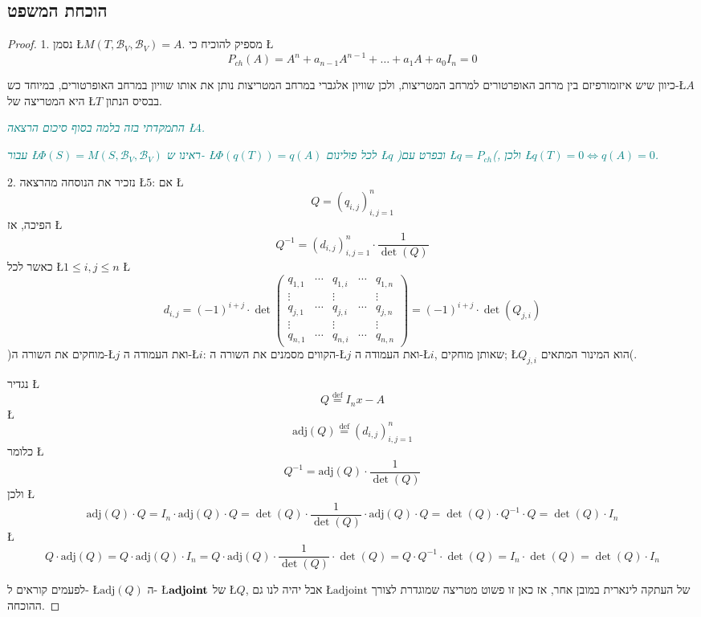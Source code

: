 \documentclass[english,hebrew]{article}
\begin{document}
\subsection{הוכחת המשפט}
\begin{proof}
1. נסמן \L{$M(T,\mathcal{B}_{V},\mathcal{B}_{V})=A$}. מספיק להוכיח
כי \L{%
\[
P_{ch}(A)=A^{n}+a_{n-1}A^{n-1}+\dots+a_{1}A+a_{0}I_{n}=0
\]
}%

כיוון שיש איזומורפיזם בין מרחב האופרטורים למרחב המטריצות, ולכן שוויון
אלגברי במרחב המטריצות נותן את אותו שוויון במרחב האופרטורים, במיוחד
כש-\L{$A$} היא המטריצה של \L{$T$} בבסיס הנתון.

\textcolor{teal}{\emph{התמקדתי בזה בלמה בסוף סיכום הרצאה \L{$4$}.}}

\textcolor{teal}{\emph{עבור \L{$\Phi(S)=M(S,\mathcal{B}_{V},\mathcal{B}_{V})$}
ראינו ש- \L{$\Phi(q(T))=q(A)$} לכל פולינום \L{$q$} )ובפרט עם \L{$q=P_{ch}$}(,
ולכן \L{$q(T)=0\iff q(A)=0$}.}}

2. נזכיר את הנוסחה מהרצאה \L{$5$}: אם \L{%
\[
Q=\left(q_{i,j}\right)_{i,j=1}^{n}
\]
}%
הפיכה, אז \L{%
\[
Q^{-1}=\left(d_{i,j}\right)_{i,j=1}^{n}\cdot\frac{1}{\det(Q)}
\]
}%
כאשר לכל \L{$1\leq i,j\leq n$} \L{%
\[
d_{i,j}=(-1)^{i+j}\cdot\det\left(\begin{array}{cc|c|cc}
q_{1,1} & \cdots & q_{1,i} & \cdots & q_{1,n}\\
\vdots &  & \vdots &  & \vdots\\
\hline q_{j,1} & \cdots & q_{j,i} & \cdots & q_{j,n}\\
\hline \vdots &  & \vdots &  & \vdots\\
q_{n,1} & \cdots & q_{n,i} & \cdots & q_{n,n}
\end{array}\right)=(-1)^{i+j}\cdot\det\left(Q_{j,i}\right)
\]
}%
)מוחקים את השורה ה-\L{$j$} ואת העמודה ה-\L{$i$}: הקווים מסמנים את
השורה ה-\L{$j$} ואת העמודה ה-\L{$i$}, שאותן מוחקים; \L{$Q_{j,i}$}
הוא המינור המתאים(.

נגדיר \L{%
\[
Q\overset{\text{def}}{=}I_{n}x-A
\]
}%
\L{%
\[
\text{adj}(Q)\overset{\text{def}}{=}\left(d_{i,j}\right)_{i,j=1}^{n}
\]
}%
כלומר \L{%
\[
Q^{-1}=\text{adj}(Q)\cdot\frac{1}{\det(Q)}
\]
}%
ולכן \L{%
\[
\text{adj}(Q)\cdot Q=I_{n}\cdot\text{adj}(Q)\cdot Q=\det(Q)\cdot\frac{1}{\det(Q)}\cdot\text{adj}(Q)\cdot Q=\det(Q)\cdot Q^{-1}\cdot Q=\det(Q)\cdot I_{n}
\]
}%
\L{%
\[
Q\cdot\text{adj}(Q)=Q\cdot\text{adj}(Q)\cdot I_{n}=Q\cdot\text{adj}(Q)\cdot\frac{1}{\det(Q)}\cdot\det(Q)=Q\cdot Q^{-1}\cdot\det(Q)=I_{n}\cdot\det(Q)=\det(Q)\cdot I_{n}
\]
}%

לפעמים קוראים ל- \L{$\text{adj}(Q)$} ה- \L{$\text{\textbf{adjoint}}$}
של \L{$Q$}, אבל יהיה לנו גם \L{$\text{adjoint}$} של העתקה לינארית
במובן אחר, אז כאן זו פשוט מטריצה שמוגדרת לצורך ההוכחה.


\end{proof}
\end{document}
